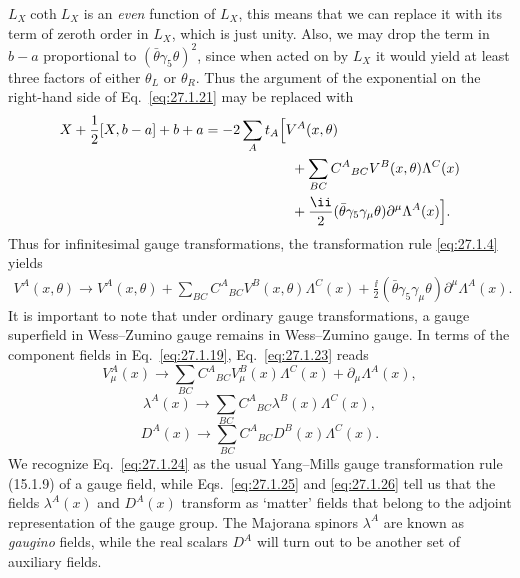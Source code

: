 \(L_X\coth L_X\) is an \textit{even} function of \(L_X\), this means that
we can replace it with its term of zeroth order in \(L_X\), which is just
unity. Also, we may drop the term in \(b-a\) proportional to
\((\bar\theta\gamma_5\theta)^2\), since when acted on by \(L_X\) it would
yield at least three factors of either \(\theta_L\) or \(\theta_R\). Thus
the argument of the exponential on the right-hand side of
Eq.~\eqref{eq:27.1.21} may be replaced with
\[
  \begin{aligned}
  X+\frac12[X,b-a]+b+a
  &=-2\sum_A t_A\Bigl[V^A(x,\theta)
  \\
  &\hspace{22mm}
    +\sum_{BC}C^A{}_{BC}V^B(x,\theta)\Lambda^C(x)
  \\
  &\hspace{22mm}
    +\frac{\ii}{2}(\bar\theta\gamma_5\gamma_\mu\theta)
      \partial^\mu\Lambda^A(x)\Bigr].
  \end{aligned}
\]
Thus for infinitesimal gauge transformations, the transformation rule
\eqref{eq:27.1.4} yields
\begin{equation}
  \begin{split}
  V^A(x,\theta)\longrightarrow
  V^A(x,\theta)
  +\sum_{BC}C^A{}_{BC}V^B(x,\theta)\Lambda^C(x)
  +\frac{\ii}{2}(\bar\theta\gamma_5\gamma_\mu\theta)
    \partial^\mu\Lambda^A(x).
  \end{split}
  \tag{27.1.23}\label{eq:27.1.23}
\end{equation}
It is important to note that under ordinary gauge transformations, a gauge
superfield in Wess--Zumino gauge remains in Wess--Zumino gauge. In terms of
the component fields in Eq.~\eqref{eq:27.1.19},
Eq.~\eqref{eq:27.1.23} reads
\begin{equation}
  V^A_\mu(x)\longrightarrow
  \sum_{BC}C^A{}_{BC}V^B_\mu(x)\Lambda^C(x)
  +\partial_\mu\Lambda^A(x),
  \tag{27.1.24}\label{eq:27.1.24}
\end{equation}
\begin{equation}
  \lambda^A(x)\longrightarrow
  \sum_{BC}C^A{}_{BC}\lambda^B(x)\Lambda^C(x),
  \tag{27.1.25}\label{eq:27.1.25}
\end{equation}
\begin{equation}
  D^A(x)\longrightarrow
  \sum_{BC}C^A{}_{BC}D^B(x)\Lambda^C(x).
  \tag{27.1.26}\label{eq:27.1.26}
\end{equation}
We recognize Eq.~\eqref{eq:27.1.24} as the usual Yang--Mills gauge
transformation rule (15.1.9) of a gauge field, while
Eqs.~\eqref{eq:27.1.25} and \eqref{eq:27.1.26} tell us that the fields
\(\lambda^A(x)\) and \(D^A(x)\) transform as `matter' fields that belong
to the adjoint representation of the gauge group. The Majorana spinors
\(\lambda^A\) are known as \textit{gaugino} fields, while the real scalars
\(D^A\) will turn out to be another set of auxiliary fields.

